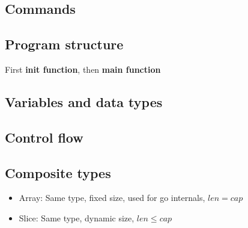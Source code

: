 \documentclass[../../main.tex]{subfiles}
\begin{document}
\subsection{Commands}


\subsection{Program structure}
First \textbf{init function}, then \textbf{main function}


\subsection{Variables and data types}


\subsection{Control flow}


\subsection{Composite types}
\begin{itemize}
    \item Array: Same type, fixed size, used for go internals, $len = cap$
    \item Slice: Same type, dynamic size, $len \le cap$
\end{itemize}

\end{document}

